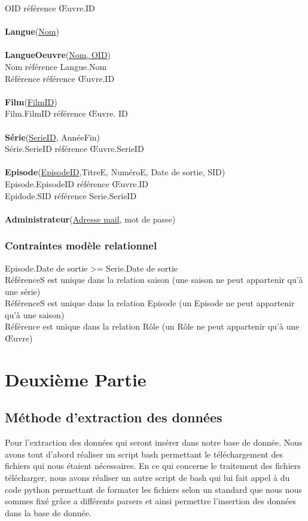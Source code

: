\documentclass[10pt,a4paper]{article}
\begin{document}
		OID référence Œuvre.ID
\\
\\
\textbf{Langue}(\underline{Nom})
\\
\\
\textbf{LangueOeuvre}(\underline{Nom, OID})
\\
	Nom référence Langue.Nom
    \\
	Référence référence Œuvre.ID
\\
\\
\textbf{Film}(\underline{FilmID})
\\
	Film.FilmID référence Œuvre. ID
\\
\\
\textbf{Série}(\underline{SerieID}, AnnéeFin)
\\
	Série.SerieID référence Œuvre.SerieID
\\
\\
\textbf{Episode}(\underline{EpisodeID},TitreE, NuméroE, Date de sortie, SID)
\\
		Episode.EpisodeID référence Œuvre.ID
        \\
		Epidode.SID référence Serie.SerieID
\\
\\
\textbf{Administrateur}(\underline{Adresse mail}, mot de passe)
\subsubsection{Contraintes modèle relationnel}
\noindent Episode.Date de sortie >= Serie.Date de sortie \\
RéférenceS est unique dans la relation saison (une saison ne peut appartenir qu’à une série) \\
RéférenceS est unique dans la relation Episode (un Episode ne peut appartenir qu’à une saison) \\
Référence est unique dans la relation Rôle (un Rôle ne peut appartenir qu’à une Œuvre)

\newpage
\section{Deuxième Partie}\label{deuxieme partie}

\subsection{Méthode d'extraction des données}

Pour l'extraction des données qui seront insérer dans notre base de donnée. Nous avons tout d'abord réaliser un script bash permettant le téléchargement des fichiers qui nous étaient nécessaires. En ce qui concerne le traitement des fichiers télécharger, nous avons réaliser un autre script de bash qui lui fait appel à du code python permettant de formater les fichiers selon un standard que nous nous sommes fixé grâce a différents parsers et ainsi permettre l'insertion des données dans la base de donnée.
\end{document}

